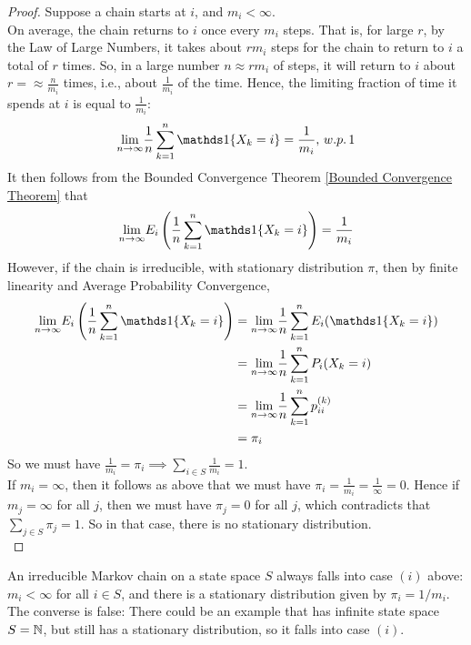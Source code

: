 \documentclass[11pt]{article}
\newcommand{\dur}[3]{{#1}_{#2}^{({#3})}}
\renewcommand{\limit}[1]{\underset{{#1} \rightarrow \infty}{\lim}}
\begin{document}
    \begin{proof}
    	Suppose a chain starts at $i$, and $m_i < \infty$. \\
    	On average, the chain returns to $i$ once every $m_i$ steps. That is, for large $r$, by the Law of Large Numbers, it takes about $rm_i$ steps for the chain to return to $i$ a total of $r$ times. So, in a large number $n \approx rm_i$ of steps, it will return to $i$ about $r = \approx \frac{n}{m_i}$ times, i.e., about $\frac{1}{m_i}$ of the time. Hence, the limiting fraction of time it spends at $i$ is equal to $\frac{1}{m_i}$:
    	$$\limit{n}\frac{1}{n}\sum_{k=1}^n \id{X_k = i} = \frac{1}{m_i}, \, w.p. \, 1$$
    	It then follows from the Bounded Convergence Theorem \ref{Bounded Convergence Theorem} that
    	$$\limit{n} E_i \left( \frac{1}{n}\sum_{k=1}^n \id{X_k = i}\right) = \frac{1}{m_i}$$
    	However, if the chain is irreducible, with stationary distribution $\pi$, then by finite linearity and Average Probability Convergence,
    	\begin{align*}
    		\limit{n} E_i\left( \frac{1}{n}\sum_{k=1}^n \id{X_k = i} \right) &= \limit{n} \frac{1}{n} \sum_{k=1}^n E_i(\id{X_k = i}) \\
    		&= \limit{n} \frac{1}{n} \sum_{k=1}^n P_i(X_k = i) \\
    		&= \limit{n} \frac{1}{n} \sum_{k=1}^n \dur{p}{ii}{k}\\
    		&= \pi_i
    	\end{align*}
    	So we must have $\frac{1}{m_i} = \pi_i \implies \sum_{i \in S} \frac{1}{m_i} = 1$.\\
    	If $m_i = \infty$, then it follows as above that we must have $\pi_i = \frac{1}{m_i} = \frac{1}{\infty} = 0$. Hence if $m_j = \infty$ for all $j$, then we must have $\pi_j = 0$ for all $j$, which contradicts that $\sum_{j \in S} \pi_j = 1$. So in that case, there is no stationary distribution.\\
    \end{proof}
    
    \proposition An irreducible Markov chain on a  state space $S$ always falls into case $(i)$ above:\\
    $m_i < \infty$ for all $i \in S$, and there is a  stationary distribution given by $\pi_i = 1/m_i$.
    \remark
    The converse is false: There could be an example that has infinite state space $S = \mathbb{N}$, but still has a stationary distribution, so it falls into case $(i)$.
\end{document}
